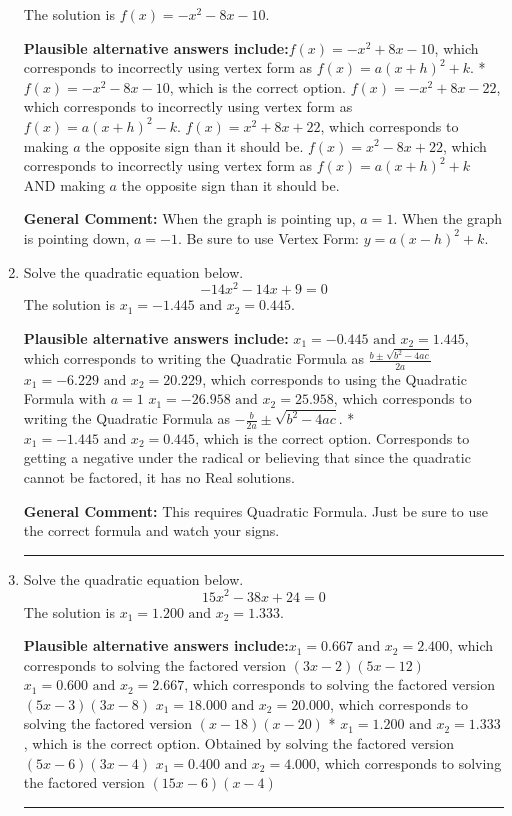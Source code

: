 \documentclass{extbook}[14pt]
\newcommand{\litem}[1]{\item #1

\rule{\textwidth}{0.4pt}}
\begin{document}
\begin{enumerate}
{The solution is \( f(x) = -x^{2} -8 x -10 \).\begin{enumerate}[label=\Alph*.]
\textbf{Plausible alternative answers include:}$f(x)=-x^{2} +8 x -10$, which corresponds to incorrectly using vertex form as $f(x) = a(x+h)^2+k$.
* $f(x)=-x^{2} -8 x -10$, which is the correct option.
$f(x)=-x^{2} +8 x -22$, which corresponds to incorrectly using vertex form as $f(x) = a(x+h)^2 - k$.
$f(x)=x^{2} +8 x + 22$, which corresponds to making $a$ the opposite sign than it should be.
$f(x)=x^{2} -8 x + 22$, which corresponds to incorrectly using vertex form as $f(x) = a(x+h)^2+k$ AND making $a$ the opposite sign than it should be.
\end{enumerate}

\textbf{General Comment:} When the graph is pointing up, $a=1$. When the graph is pointing down, $a=-1$. Be sure to use Vertex Form: $y = a(x-h)^2+k$.
}
\litem{
Solve the quadratic equation below.
\[ -14x^{2} -14 x + 9 = 0 \]The solution is \( x_1 = -1.445 \text{ and } x_2 = 0.445 \).\begin{enumerate}[label=\Alph*.]
\textbf{Plausible alternative answers include:} $x_1 = -0.445 \text{ and } x_2 = 1.445$, which corresponds to writing the Quadratic Formula as $\frac{b \pm \sqrt{b^2 - 4ac}}{2a}$
 $x_1 = -6.229 \text{ and } x_2 = 20.229$, which corresponds to using the Quadratic Formula with $a=1$
 $x_1 = -26.958 \text{ and } x_2 = 25.958$, which corresponds to writing the Quadratic Formula as $-\frac{b}{2a} \pm \sqrt{b^2 - 4ac}$.
* $x_1 = -1.445 \text{ and } x_2 = 0.445$, which is the correct option.
Corresponds to getting a negative under the radical or believing that since the quadratic cannot be factored, it has no Real solutions.
\end{enumerate}

\textbf{General Comment:} This requires Quadratic Formula. Just be sure to use the correct formula and watch your signs.
}
\litem{
Solve the quadratic equation below.
\[ 15x^{2} -38 x + 24 = 0 \]The solution is \( x_1 = 1.200 \text{ and } x_2 = 1.333 \).\begin{enumerate}[label=\Alph*.]
\textbf{Plausible alternative answers include:}$x_1 = 0.667 \text{ and } x_2 = 2.400$, which corresponds to solving the factored version $(3x -2)(5x -12)$
$x_1 = 0.600 \text{ and } x_2 = 2.667$, which corresponds to solving the factored version $(5x -3)(3x -8)$
$x_1 = 18.000 \text{ and } x_2 = 20.000$, which corresponds to solving the factored version $(x -18)(x -20)$
* $x_1 = 1.200 \text{ and } x_2 = 1.333$, which is the correct option. Obtained by solving the factored version $(5x -6)(3x -4)$
$x_1 = 0.400 \text{ and } x_2 = 4.000$, which corresponds to solving the factored version $(15x -6)(x -4)$
\end{enumerate}

}
\end{enumerate}
\end{document}
